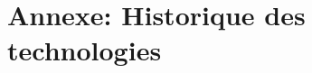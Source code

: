 \documentclass[a4paper]{article}
\begin{document}




\listoffigures  %




\newpage

\section*{Annexe: Historique des technologies}
\end{document}
